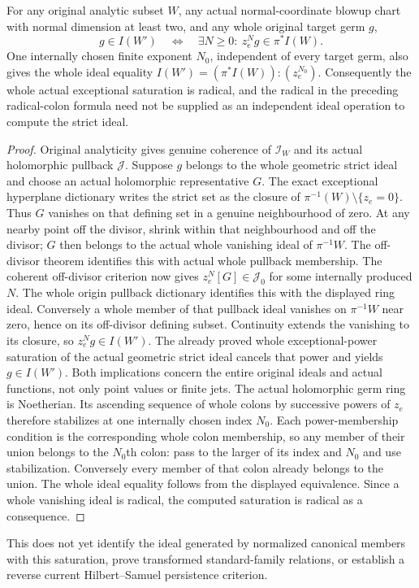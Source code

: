 \begin{theorem}
\label{hir:actual-original-analytic-geometric-strict-whole-saturation}
\leanok
For any original analytic subset $W$, any actual normal-coordinate blowup
chart with normal dimension at least two, and any whole original target
germ $g$,
\[
 g\in I(W')\quad\Longleftrightarrow\quad
 \exists N\ge0:\ z_e^Ng\in\pi^*I(W).
\]
One internally chosen finite exponent $N_0$, independent of every target germ, also gives the whole ideal equality $I(W')=(\pi^*I(W)):(z_e^{N_0})$.
Consequently the whole actual exceptional saturation is radical, and the
radical in the preceding radical-colon formula need not be supplied as
an independent ideal operation to compute the strict ideal.
\end{theorem}
\begin{proof}
Original analyticity gives genuine coherence of $\mathcal I_W$ and its
actual holomorphic pullback $\mathcal J$. Suppose $g$ belongs to the
whole geometric strict ideal and choose an actual holomorphic
representative $G$. The exact exceptional hyperplane dictionary writes
the strict set as the closure of $\pi^{-1}(W)\setminus\{z_e=0\}$.
Thus $G$ vanishes on that defining set in a genuine neighbourhood of
zero. At any nearby point off the divisor, shrink within that
neighbourhood and off the divisor; $G$ then belongs to the actual whole
vanishing ideal of $\pi^{-1}W$. The off-divisor theorem identifies this
with actual whole pullback membership. The coherent off-divisor criterion
now gives $z_e^N[G]\in\mathcal J_0$ for some internally produced $N$.
The whole origin pullback dictionary identifies this with the displayed
ring ideal. Conversely a whole member of that pullback ideal vanishes
on $\pi^{-1}W$ near zero, hence on its off-divisor defining subset.
Continuity extends the vanishing to its closure, so $z_e^Ng\in I(W')$.
The already proved whole exceptional-power saturation of the actual
geometric strict ideal cancels that power and yields $g\in I(W')$.
Both implications concern the entire original ideals and actual functions,
not only point values or finite jets. The actual holomorphic germ ring is Noetherian. Its ascending sequence of whole colons by successive powers of $z_e$ therefore stabilizes at one internally chosen index $N_0$. Each power-membership condition is the corresponding whole colon membership, so any member of their union belongs to the $N_0$th colon: pass to the larger of its index and $N_0$ and use stabilization. Conversely every member of that colon already belongs to the union. The whole ideal equality follows from the displayed equivalence. Since a whole vanishing ideal is radical, the computed saturation is radical as a consequence.
\end{proof}

This does not yet identify the ideal generated by normalized canonical
members with this saturation, prove transformed standard-family relations,
or establish a reverse current Hilbert--Samuel persistence criterion.
